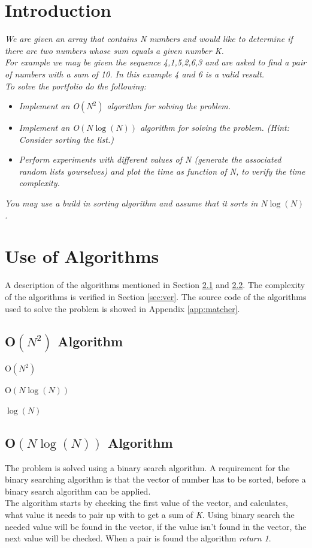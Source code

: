 \section{Introduction}
\emph{We are given an array that contains N numbers and would like to determine if there are two numbers whose sum equals a given number K.\\
For example we may be given the sequence 4,1,5,2,6,3 and are asked to find a pair of numbers with a sum of 10. In this example 4 and 6 is a valid result.\\
To solve the portfolio do the following:}
\begin{itemize}

\item \emph{Implement an O\(\left( { N }^{ 2 } \right)\) algorithm for solving the problem.}
\item \emph{Implement an O\(\left( N\log {(N)}  \right) \) algorithm for solving the problem. (Hint: Consider sorting the list.)}
\item \emph{Perform experiments with different values of N (generate the associated random lists yourselves)
and plot the time as function of N, to verify the time complexity.}
\end{itemize}
\emph{You may use a build in sorting algorithm and assume that it sorts in \( N\log {(N) }  \).}

\section{Use of Algorithms}
A description of the algorithms mentioned in Section \ref{sec:algorithm1} and \ref{sec:algorithm2}. 
The complexity of the algorithms is verified in Section \ref{sec:ver}.
The source code of the algorithms used to solve the problem is showed in Appendix \ref{app:matcher}.


\subsection{O\(\left( { N }^{ 2 } \right)\) Algorithm}
\label{sec:algorithm1} 


O\(\left( { N }^{ 2 } \right)\)

O\(\left( N\log {(N)}  \right) \)

\( \log {(N)} \)


\subsection{O\(\left( N\log {(N)}  \right) \) Algorithm}
\label{sec:algorithm2}
The problem is solved using a binary search algorithm. A requirement for the binary searching algorithm is that the vector of number has to be sorted, before a binary search algorithm can be applied. \\
The algorithm starts by checking the first value of the vector, and calculates, what value it needs to pair up with to get a sum of \emph{K}.  Using binary search the needed value will be found in the vector, if the value isn't found in the vector, the next value will be checked.  When a pair is found the algorithm \emph{return 1}. \\

